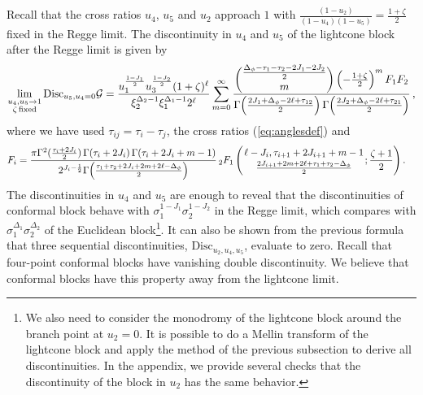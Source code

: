 Recall that the cross ratios $u_4$, $u_5$ and $u_2$ approach $1$ with $\tfrac{(1-u_2)}{(1-u_4)(1-u_5)}=\tfrac{1 + \zeta}{2}$ fixed in the Regge limit.
The discontinuity in $u_4$ and $u_5$  of the lightcone block after  the Regge limit is given by
\begin{align}
  \lim_{\substack{   u_4,u_5\rightarrow 1 \\   \zeta \, \textrm{fixed}}}\textrm{Disc}_{u_5,u_4=0} \mathcal{G}
  =\frac{u_1^{\frac{1-J_1}{2}}u_3^{\frac{1-J_2}{2}  }
  (1+\zeta)^{\ell} }{\xi_2^{\Delta_2-1}\xi_1^{\Delta_1-1} 2^{\ell} }\sum_{m=0}^{\infty}
  \frac{	\dbinom{\frac{\Delta_{\phi}-\tau_1-\tau_2-2J_1-2J_2}{2}}{m}
    \left( -\frac{1+\zeta}{2} \right)^{m}
    F_1 F_2
  }{
    \Gamma\!\left(\frac{2J_1+\Delta_{\phi}-2\ell+\tau_{12}}{2}\right) \Gamma\!\left(\frac{2J_2+\Delta_{\phi}-2\ell+\tau_{21}}{2}\right)
  }\,,
  \label{eq:discInu4u5}
\end{align}
where we have used $\tau_{ij}=\tau_i-\tau_j$, the cross ratios (\ref{eq:anglesdef}) and  %
\begin{align}
  F_i & =
  \frac{
    \pi
    \Gamma^2(\frac{\tau_i+2J_i}{2})\, \Gamma(\tau_i+2J_i)\,\Gamma(\tau_i+2J_i+m-1)}{
    2^{J_i-\frac{1}{2}}
    \Gamma\!\left(\frac{\tau_1+\tau_2+2J_i+2m+2\ell-\Delta_{\phi}}{2}\right)
  }
  \, \pFq{2}{1}{ \ell-J_i,\tau_{i+1}+2J_{i+1}+m-1}{\tfrac{2J_{i+1}+2m+2\ell+\tau_1+\tau_2-\Delta_{\phi}}{2}}{\frac{\zeta+1}{2} }.\nonumber
\end{align}
The discontinuities in $u_4$ and $u_5$ are enough to reveal that the discontinuities of conformal block behave with $\sigma_1^{1-J_1}\sigma_2^{1-J_2}$ in the Regge limit, which compares with $\sigma_1^{\Delta_1}\sigma_2^{\Delta_2}$ of the Euclidean block\footnote{We also need to consider the monodromy of the lightcone block around the branch point at $u_2=0$.  It is possible to do  a Mellin transform of the lightcone block and apply the method of the previous subsection to derive all discontinuities. In the appendix, we provide several checks that the discontinuity of the block in $u_2$ has the same behavior. }.
It can also be shown from the previous formula that three sequential discontinuities,  $\textrm{Disc}_{u_2,u_4,u_5}$, evaluate to zero.
Recall that four-point conformal blocks have vanishing double discontinuity.
We believe that conformal blocks have this property away from the lightcone limit.


